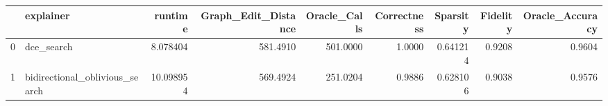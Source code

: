 \begin{tabular}{llrrrrrrr}
\toprule
{} &                       explainer &    runtime &  Graph\_Edit\_Distance &  Oracle\_Calls &  Correctness &  Sparsity &  Fidelity &  Oracle\_Accuracy \\
\midrule
0 &                      dce\_search &   8.078404 &             581.4910 &      501.0000 &       1.0000 &  0.641214 &    0.9208 &           0.9604 \\
1 &  bidirectional\_oblivious\_search &  10.098954 &             569.4924 &      251.0204 &       0.9886 &  0.628106 &    0.9038 &           0.9576 \\
\bottomrule
\end{tabular}
